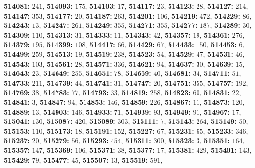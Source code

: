 \textsf{\bfseries 514081:} $241$, \textsf{\bfseries 514093:} $175$, \textsf{\bfseries 514103:} $17$, \textsf{\bfseries 514117:} $23$, \textsf{\bfseries 514123:} $28$, \textsf{\bfseries 514127:} $214$, \textsf{\bfseries 514147:} $353$, \textsf{\bfseries 514177:} $20$, \textsf{\bfseries 514187:} $263$, \textsf{\bfseries 514201:} $106$, \textsf{\bfseries 514219:} $472$, \textsf{\bfseries 514229:} $86$, \textsf{\bfseries 514243:} $13$, \textsf{\bfseries 514247:} $261$, \textsf{\bfseries 514249:} $355$, \textsf{\bfseries 514271:} $355$, \textsf{\bfseries 514277:} $187$, \textsf{\bfseries 514289:} $30$, \textsf{\bfseries 514309:} $110$, \textsf{\bfseries 514313:} $31$, \textsf{\bfseries 514333:} $11$, \textsf{\bfseries 514343:} $42$, \textsf{\bfseries 514357:} $19$, \textsf{\bfseries 514361:} $276$, \textsf{\bfseries 514379:} $195$, \textsf{\bfseries 514399:} $108$, \textsf{\bfseries 514417:} $66$, \textsf{\bfseries 514429:} $67$, \textsf{\bfseries 514433:} $150$, \textsf{\bfseries 514453:} $6$, \textsf{\bfseries 514499:} $259$, \textsf{\bfseries 514513:} $19$, \textsf{\bfseries 514519:} $238$, \textsf{\bfseries 514523:} $54$, \textsf{\bfseries 514529:} $47$, \textsf{\bfseries 514531:} $46$, \textsf{\bfseries 514543:} $103$, \textsf{\bfseries 514561:} $28$, \textsf{\bfseries 514571:} $336$, \textsf{\bfseries 514621:} $94$, \textsf{\bfseries 514637:} $30$, \textsf{\bfseries 514639:} $15$, \textsf{\bfseries 514643:} $23$, \textsf{\bfseries 514649:} $255$, \textsf{\bfseries 514651:} $78$, \textsf{\bfseries 514669:} $40$, \textsf{\bfseries 514681:} $34$, \textsf{\bfseries 514711:} $51$, \textsf{\bfseries 514733:} $211$, \textsf{\bfseries 514739:} $44$, \textsf{\bfseries 514741:} $31$, \textsf{\bfseries 514747:} $20$, \textsf{\bfseries 514751:} $355$, \textsf{\bfseries 514757:} $192$, \textsf{\bfseries 514769:} $38$, \textsf{\bfseries 514783:} $77$, \textsf{\bfseries 514793:} $33$, \textsf{\bfseries 514819:} $258$, \textsf{\bfseries 514823:} $60$, \textsf{\bfseries 514831:} $22$, \textsf{\bfseries 514841:} $3$, \textsf{\bfseries 514847:} $94$, \textsf{\bfseries 514853:} $146$, \textsf{\bfseries 514859:} $226$, \textsf{\bfseries 514867:} $11$, \textsf{\bfseries 514873:} $120$, \textsf{\bfseries 514889:} $13$, \textsf{\bfseries 514903:} $146$, \textsf{\bfseries 514933:} $71$, \textsf{\bfseries 514939:} $93$, \textsf{\bfseries 514949:} $91$, \textsf{\bfseries 514967:} $17$, \textsf{\bfseries 515041:} $130$, \textsf{\bfseries 515087:} $420$, \textsf{\bfseries 515089:} $303$, \textsf{\bfseries 515111:} $7$, \textsf{\bfseries 515143:} $264$, \textsf{\bfseries 515149:} $50$, \textsf{\bfseries 515153:} $110$, \textsf{\bfseries 515173:} $18$, \textsf{\bfseries 515191:} $152$, \textsf{\bfseries 515227:} $67$, \textsf{\bfseries 515231:} $65$, \textsf{\bfseries 515233:} $346$, \textsf{\bfseries 515237:} $20$, \textsf{\bfseries 515279:} $56$, \textsf{\bfseries 515293:} $454$, \textsf{\bfseries 515311:} $300$, \textsf{\bfseries 515323:} $3$, \textsf{\bfseries 515351:} $164$, \textsf{\bfseries 515357:} $147$, \textsf{\bfseries 515369:} $106$, \textsf{\bfseries 515371:} $38$, \textsf{\bfseries 515377:} $17$, \textsf{\bfseries 515381:} $429$, \textsf{\bfseries 515401:} $143$, \textsf{\bfseries 515429:} $79$, \textsf{\bfseries 515477:} $45$, \textsf{\bfseries 515507:} $13$, \textsf{\bfseries 515519:} $591$, 
